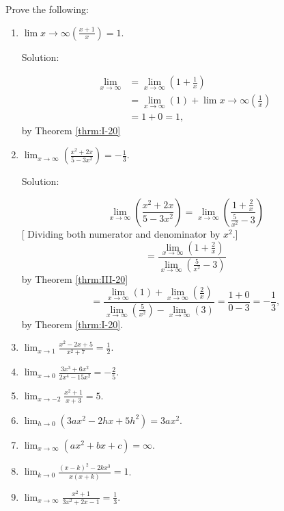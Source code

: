 Prove the following:
\begin{enumerate}
\item
$\lim{x \to \infty} \left ( \frac{x + 1}{x} \right ) = 1$.

Solution:

\[
\begin{array}{ll}
\lim_{x \to \infty} &	= \lim_{x \to \infty} \left ( 1 + \frac{1}{x} \right )\\
&  	= \lim_{x \to \infty} (1) + \lim{x \to \infty} \left ( \frac{1}{x} \right )   \\
 & 	= 1 + 0 = 1,
\end{array}
\]
by Theorem \ref{thrm:I-20}

\item
$ \lim_{x \to \infty} \left ( \frac{x^2 + 2x}{5 - 3x^2} \right ) = -\frac{1}{3}$.

Solution:

\[
\lim_{x \to \infty} \left ( \frac{x^2 + 2x}{5 - 3x^2} \right ) 	
= \lim_{x \to \infty} \left ( \frac{1 + \frac{2}{x}}{\frac{5}{x^2} - 3} \right )
\]
[ Dividing both numerator and denominator by $x^2$.]
\[
= \frac{\lim_{x \to \infty} \left ( 1 + \frac{2}{x} \right )}{\lim_{x \to \infty} 
\left ( \frac{5}{x^2} - 3 \right )}  
\]
by Theorem \ref{thrm:III-20}
\[
 	= \frac{\lim_{x \to \infty} (1) + \lim_{x \to \infty} \left ( \frac{2}{x} \right ) }{ \lim_{x \to \infty} \left ( \frac{5}{x^2} \right ) - \lim_{x \to \infty} (3)}   
  	= \frac{1 + 0}{0 - 3} = -\frac{1}{3},
\]
by Theorem \ref{thrm:I-20}.

\item
$ \lim_{x \to 1} \frac{x^2 - 2x + 5}{x^2 + 7} = \frac{1}{2}$.

\item
$ \lim_{x \to 0} \frac{3x^3 + 6x^2}{2x^4 - 15x^2} = -\frac{2}{5}$.

\item
$ \lim_{x \to -2} \frac{x^2 + 1}{x + 3} = 5$.

\item
$ \lim_{h \to 0} (3ax^2 - 2hx + 5h^2) = 3ax^2$.

\item
$ \lim_{x \to \infty} (ax^2 + bx + c) = \infty$.

\item
$ \lim_{k \to 0} \frac{(x - k)^2 - 2kx^3}{x(x + k)} = 1$.

\item
$ \lim_{x \to \infty} \frac{x^2 + 1}{3x^2 + 2x - 1} = \frac{1}{3}$.


\end{enumerate}
